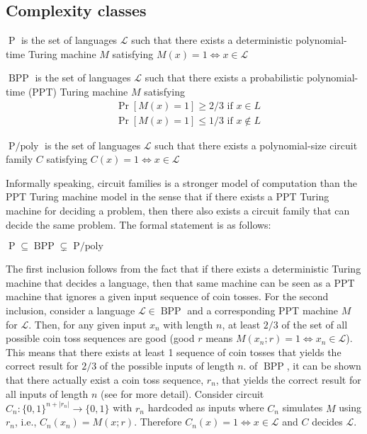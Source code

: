 \subsection*{Complexity classes}\label{subsec:Complexity classes}
\begin{definition}
$\operatorname{P}$ is the set of languages $\mathscr{L}$ such that there exists a deterministic polynomial-time Turing machine $M$ satisfying $M(x) = 1 \iff x \in \mathscr{L}$ 
\end{definition}
\begin{definition}
$\operatorname{BPP}$ is the set of languages $\mathscr{L}$ such that there exists a probabilistic polynomial-time (PPT) Turing machine $M$ satisfying
\begin{align*}
& \operatorname{Pr}[M(x)=1] \geq 2/3 \text{ if $x \in L$}
\\
& \operatorname{Pr}[M(x)=1] \leq 1/3 \text{ if $x \notin L$}
\end{align*}
\end{definition}
\begin{definition}
$\operatorname{P/poly}$ is the set of languages $\mathscr{L}$ such that there exists a polynomial-size circuit family $C$ satisfying $C(x) = 1 \iff x \in \mathscr{L}$ 
\end{definition}
Informally speaking, circuit families is a stronger model of computation than the PPT Turing machine model in the sense that if there exists a PPT Turing machine for deciding a problem, then there also exists a circuit family that can decide the same problem. The formal statement is as follows: 
\begin{theorem}
    \label{thm:compl-class}
    $\operatorname{P} \subseteq \operatorname{BPP} \subsetneq \operatorname{P/poly}$
\end{theorem}
The first inclusion follows from the fact that if there exists a deterministic Turing machine that decides a language, then that same machine can be seen as a PPT machine that ignores a given input sequence of coin tosses. For the second inclusion, consider a language $\mathscr{L} \in \operatorname{BPP}$ and a corresponding PPT machine $M$ for $\mathscr{L}$. Then, for any given input $x_n$ with length $n$, at least $2/3$ of the set of all possible coin toss sequences are good (good $r$ means $M(x_n;r) = 1 \iff x_n \in \mathscr{L}$). This means that there exists at least 1 sequence of coin tosses that yields the correct result for $2/3$ of the possible inputs of length $n$.  of $\operatorname{BPP}$, it can be shown that there actually exist a coin toss sequence, $r_n$, that yields the correct result for all inputs of length $n$ (see \cite{Adleman1978TwoTO,Gol01} for more detail). Consider circuit $C_n \colon \{0,1\}^{n+|r_n|} \to \{0,1\}$ with $r_n$ hardcoded as inputs where $C_n$ simulates $M$ using $r_n$, i.e., $C_n(x_n) = M(x;r)$. Therefore $C_n(x) = 1 \iff x \in \mathscr{L}$ and $C$ decides $\mathscr{L}$.

